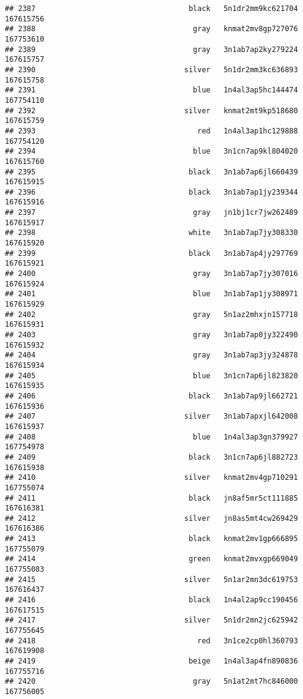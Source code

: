 \documentclass[
]{article}
\begin{document}
\begin{verbatim}
## 2387                                   black   5n1dr2mm9kc621704 167615756
## 2388                                    gray   knmat2mv8gp727076 167753610
## 2389                                    gray   3n1ab7ap2ky279224 167615757
## 2390                                  silver   5n1dr2mm3kc636893 167615758
## 2391                                    blue   1n4al3ap5hc144474 167754110
## 2392                                  silver   knmat2mt9kp518680 167615759
## 2393                                     red   1n4al3ap1hc129888 167754120
## 2394                                    blue   3n1cn7ap9kl804020 167615760
## 2395                                   black   3n1ab7ap6jl660439 167615915
## 2396                                   black   3n1ab7ap1jy239344 167615916
## 2397                                    gray   jn1bj1cr7jw262489 167615917
## 2398                                   white   3n1ab7ap7jy308330 167615920
## 2399                                   black   3n1ab7ap4jy297769 167615921
## 2400                                    gray   3n1ab7ap7jy307016 167615924
## 2401                                    blue   3n1ab7ap1jy308971 167615929
## 2402                                    gray   5n1az2mhxjn157718 167615931
## 2403                                    gray   3n1ab7ap0jy322490 167615932
## 2404                                    gray   3n1ab7ap3jy324878 167615934
## 2405                                    blue   3n1cn7ap6jl823820 167615935
## 2406                                   black   3n1ab7ap9jl662721 167615936
## 2407                                  silver   3n1ab7apxjl642008 167615937
## 2408                                    blue   1n4al3ap3gn379927 167754978
## 2409                                   black   3n1cn7ap6jl882723 167615938
## 2410                                  silver   knmat2mv4gp710291 167755074
## 2411                                   black   jn8af5mr5ct111885 167616381
## 2412                                  silver   jn8as5mt4cw269429 167616386
## 2413                                   black   knmat2mv1gp666895 167755079
## 2414                                   green   knmat2mvxgp669049 167755083
## 2415                                  silver   5n1ar2mn3dc619753 167616437
## 2416                                   black   1n4al2ap9cc190456 167617515
## 2417                                  silver   5n1dr2mn2jc625942 167755645
## 2418                                     red   3n1ce2cp0hl360793 167619908
## 2419                                   beige   1n4al3ap4fn890836 167755716
## 2420                                    gray   5n1at2mt7hc846000 167756005

\end{verbatim}
\end{document}
